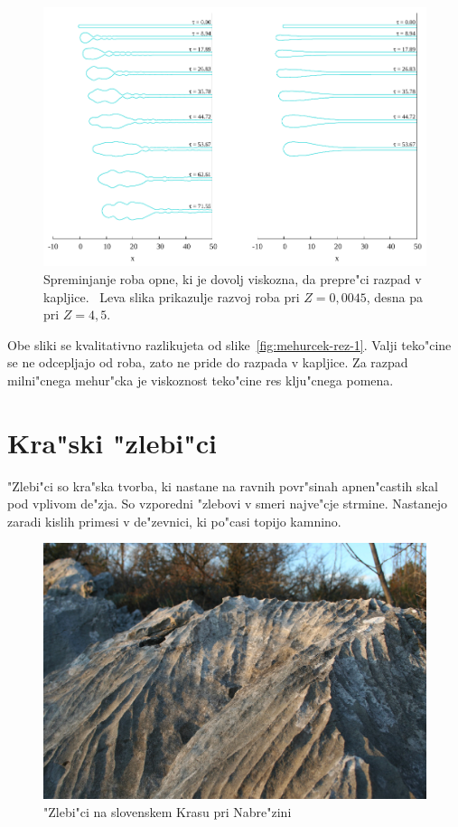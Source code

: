 \documentclass[a4paper,10pt]{article}
\begin{document}
\begin{figure}[h]
  \centering
\includegraphics[width=.9\textwidth]{./Slike/scat-rezultat-1}
\caption{Spreminjanje roba opne, ki je dovolj viskozna, da prepre"ci razpad v kapljice.~\cite{scat}
Leva slika prikazulje razvoj roba pri $Z=0,0045$, desna pa pri $Z=4,5$. }
\label{fig:mehurcek-rez-vis-1}
\end{figure}

Obe sliki se kvalitativno razlikujeta od slike~\ref{fig:mehurcek-rez-1}. Valji teko"cine se ne odcepljajo od roba, zato ne pride do razpada v kapljice. Za razpad milni"cnega mehur"cka je viskoznost teko"cine res klju"cnega pomena. 

\clearpage
\section{Kra"ski "zlebi"ci}

"Zlebi"ci so kra"ska tvorba, ki nastane na ravnih povr"sinah apnen"castih skal pod vplivom de"zja. So vzporedni "zlebovi v smeri najve"cje strmine. Nastanejo zaradi kislih primesi v de"zevnici, ki po"casi topijo kamnino. 

\begin{figure}[h]
\centering
 \includegraphics[width=.8\textwidth]{./Slike/Zlebici}
 \caption{"Zlebi"ci na slovenskem Krasu pri Nabre"zini~\cite{wiki:zlebic} }
 \label{fig:zlebici-slika}
\end{figure}
\end{document}
